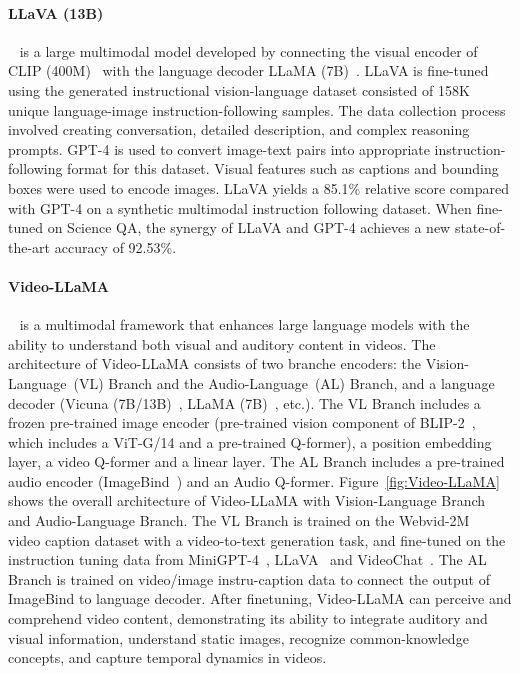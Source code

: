 \documentclass[11pt]{article}
\begin{document}
\paragraph{LLaVA (13B)}~\citep{Liu2023VisualIT} is a large multimodal model developed by connecting the visual encoder of CLIP (400M)~\citep{Radford2021LearningTV} with the language decoder LLaMA (7B)~\citep{Touvron2023LLaMAOA}. LLaVA is fine-tuned using the generated instructional vision-language dataset consisted of 158K unique language-image instruction-following samples. The data collection process involved creating conversation, detailed description, and complex reasoning prompts. GPT-4 is used to convert image-text pairs into appropriate instruction-following format for this dataset. Visual features such as captions and bounding boxes were used to encode images. LLaVA yields a 85.1\% relative score compared with GPT-4 on a synthetic multimodal instruction following dataset. When fine-tuned on Science QA, the synergy of LLaVA and GPT-4 achieves a new state-of-the-art accuracy of 92.53\%.

\paragraph{Video-LLaMA}~\citep{damonlpsg2023videollama} is a multimodal framework that enhances large language models with the ability to understand both visual and auditory content in videos. The architecture of Video-LLaMA consists of two branche encoders: the Vision-Language~(VL) Branch and the Audio-Language~(AL) Branch, and a language decoder (Vicuna (7B/13B)~\citep{chiang2023vicuna}, LLaMA (7B)~\citep{Touvron2023LLaMAOA}, etc.). 
The VL Branch includes a frozen pre-trained image encoder (pre-trained vision component of BLIP-2~\citep{li2023blip2}, which includes a ViT-G/14 and a pre-trained Q-former), a position embedding layer, a video Q-former and a linear layer. 
The AL Branch includes a pre-trained audio encoder (ImageBind~\citep{girdhar2023imagebind}) and an Audio Q-former. Figure~\ref{fig:Video-LLaMA} shows the overall architecture of Video-LLaMA with Vision-Language Branch and Audio-Language Branch. 
The VL Branch is trained on the Webvid-2M~\citep{bain2021frozen} video caption dataset with a video-to-text generation task, and fine-tuned on the instruction tuning data from MiniGPT-4~\citep{zhu2023minigpt}, LLaVA~\citep{Liu2023VisualIT} and VideoChat~\citep{2023videochat}. The AL Branch is trained on video/image instru-caption data to connect the output of ImageBind to language decoder. 
After finetuning, Video-LLaMA can perceive and comprehend video content, demonstrating its ability to integrate auditory and visual information, understand static images, recognize common-knowledge concepts, and capture temporal dynamics in videos. 
\end{document}
